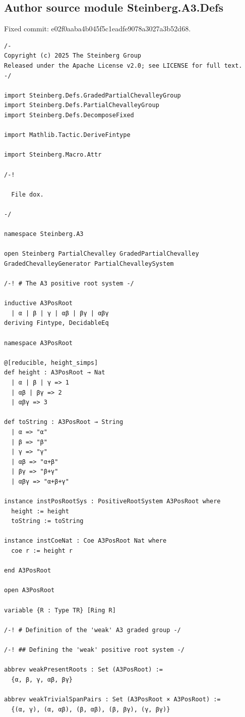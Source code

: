 \documentclass[10pt,a4paper]{article}
\begin{document}
\subsection*{Author source module Steinberg.A3.Defs}
\noindent Fixed commit: e02f0aaba4b045f5c1eadfe9078a3027a3b52d68.
\begin{Verbatim}
/-
Copyright (c) 2025 The Steinberg Group
Released under the Apache License v2.0; see LICENSE for full text.
-/

import Steinberg.Defs.GradedPartialChevalleyGroup
import Steinberg.Defs.PartialChevalleyGroup
import Steinberg.Defs.DecomposeFixed

import Mathlib.Tactic.DeriveFintype

import Steinberg.Macro.Attr

/-!

  File dox.

-/

namespace Steinberg.A3

open Steinberg PartialChevalley GradedPartialChevalley GradedChevalleyGenerator PartialChevalleySystem

/-! # The A3 positive root system -/

inductive A3PosRoot
  | α | β | γ | αβ | βγ | αβγ
deriving Fintype, DecidableEq

namespace A3PosRoot

@[reducible, height_simps]
def height : A3PosRoot → Nat
  | α | β | γ => 1
  | αβ | βγ => 2
  | αβγ => 3

def toString : A3PosRoot → String
  | α => "α"
  | β => "β"
  | γ => "γ"
  | αβ => "α+β"
  | βγ => "β+γ"
  | αβγ => "α+β+γ"

instance instPosRootSys : PositiveRootSystem A3PosRoot where
  height := height
  toString := toString

instance instCoeNat : Coe A3PosRoot Nat where
  coe r := height r

end A3PosRoot

open A3PosRoot

variable {R : Type TR} [Ring R]

/-! # Definition of the 'weak' A3 graded group -/

/-! ## Defining the 'weak' positive root system -/

abbrev weakPresentRoots : Set (A3PosRoot) :=
  {α, β, γ, αβ, βγ}

abbrev weakTrivialSpanPairs : Set (A3PosRoot × A3PosRoot) :=
  {(α, γ), (α, αβ), (β, αβ), (β, βγ), (γ, βγ)}


\end{Verbatim}
\end{document}
